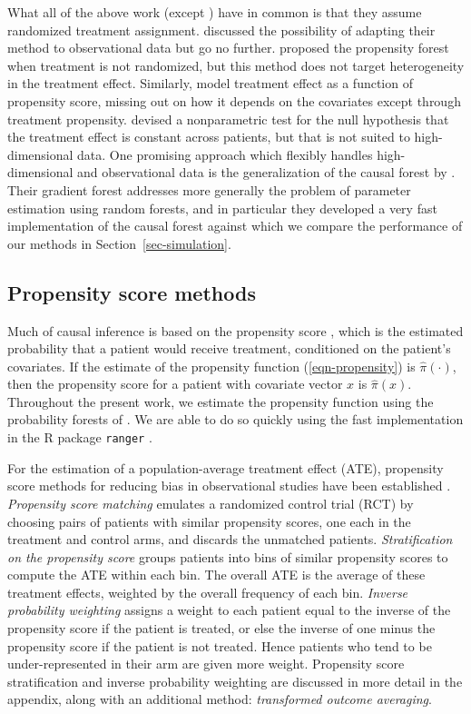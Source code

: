 \documentclass{article}
\begin{document}
What all of the above work (except \cite{Hill11}) have in common is that
they
assume randomized treatment assignment. \cite{AtheyImbens16}
discussed the
possibility of adapting their method to observational data but go no further.
\cite{WagerAthey15} proposed the propensity forest when
treatment is not
randomized, but this method does not target heterogeneity in the treatment
effect. Similarly, \cite{Xie-etal12} model treatment effect as
a function of
propensity score, missing out on how it depends on the covariates except
through treatment propensity. \cite{Crump-etal08} devised a
nonparametric
test for the null hypothesis that the treatment effect is constant across
patients, but that is not suited to high-dimensional data. One promising
approach which flexibly handles high-dimensional and observational data is the
generalization of the causal forest by \cite{Athey-etal17}.
Their gradient forest addresses more generally the problem of parameter
estimation using random forests, and in particular they developed a very fast
implementation of the causal forest against which we compare the performance of
our methods in Section~\ref{sec-simulation}.


\subsection{Propensity score methods}
\label{sub-propensity}

Much of causal inference is based on the propensity score
\citep{RosenbaumRubin83}, which is the estimated probability that a patient
would receive treatment, conditioned on the patient's covariates. If the
estimate of the propensity function (\ref{eqn-propensity}) is
$\hat\pi(\cdot)$,
then the propensity score for a patient with covariate vector $x$ is
$\hat\pi(x)$. Throughout the present work, we estimate the propensity
function using the probability forests of
\cite{Malley-etal12}. We are able to
do so quickly using the fast implementation in the R package {\tt ranger}
\citep{WrightZiegler15}.

For the estimation of a population-average treatment effect (ATE), propensity
score methods for reducing bias in observational studies have been
established \citep{Austin11}. {\it Propensity score matching} emulates a
randomized
control trial (RCT) by choosing pairs of patients with similar propensity
scores, one each in the treatment and control arms, and discards the unmatched
patients. {\it Stratification on the propensity score} groups patients into
bins of similar propensity scores to compute the ATE within each bin. The
overall ATE is the average of these treatment effects, weighted by the overall
frequency of each bin. {\it Inverse probability weighting} assigns a weight to
each patient equal to the inverse of the propensity score if the patient is
treated, or else the inverse of one minus the propensity score if the patient
is not treated. Hence patients
who tend to be under-represented in their arm are given more weight. Propensity
score stratification and inverse probability weighting are discussed in more
detail in the appendix, along with an additional method: {\it transformed
outcome averaging}.
\end{document}
